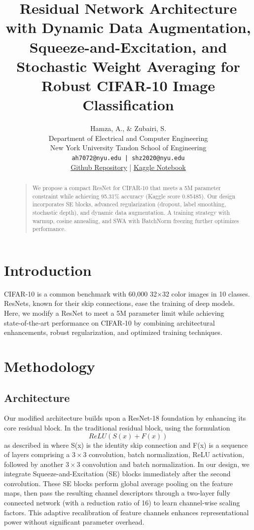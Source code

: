 \documentclass[letterpaper]{article}
\begin{document}
\title{Residual Network Architecture with Dynamic Data Augmentation, Squeeze-and-Excitation, and Stochastic Weight Averaging for Robust CIFAR-10 Image Classification}
\author{Hamza, A., \& Zubairi, S. \\
Department of Electrical and Computer Engineering\\
New York University Tandon School of Engineering\\
\texttt{ah7072@nyu.edu | shz2020@nyu.edu}\\
\href{https://github.com/hurryingauto3/ece-gy-7143-deeplearning/tree/main/project_1}{Github Repository} | \href{https://www.kaggle.com/code/hurryingauto3/notebookeb139646e3}{Kaggle Notebook}
}
\maketitle
\begin{abstract}
\begin{quote}
We propose a compact ResNet for CIFAR‑10 that meets a 5M parameter constraint while achieving 95.31\% accuracy (Kaggle score 0.85485). Our design incorporates SE blocks, advanced regularization (dropout, label smoothing, stochastic depth), and dynamic data augmentation. A training strategy with warmup, cosine annealing, and SWA with BatchNorm freezing further optimizes performance.
\end{quote}
\end{abstract}
\section{Introduction}
CIFAR‑10 is a common benchmark with 60,000 32×32 color images in 10 classes. ResNets, known for their skip connections, ease the training of deep models. Here, we modify a ResNet to meet a 5M parameter limit while achieving state‑of‑the‑art performance on CIFAR‑10 by combining architectural enhancements, robust regularization, and optimized training techniques.

\section{Methodology}
\subsection{Architecture}
Our modified architecture builds upon a ResNet-18 foundation by enhancing its core residual block. In the traditional residual block, using the formulation \[ReLU(S(x)+F(x))\] as described in \cite{he2015deep} where S(x) is the identity skip connection and F(x) is a sequence of layers comprising a $3\times 3$ convolution, batch normalization, ReLU activation, followed by another $3\times 3$ convolution and batch normalization. In our design, we integrate Squeeze-and-Excitation (SE) blocks \cite{hu2018squeeze} immediately after the second convolution. These SE blocks perform global average pooling on the feature maps, then pass the resulting channel descriptors through a two-layer fully connected network (with a reduction ratio of 16) to learn channel-wise scaling factors. This adaptive recalibration of feature channels enhances representational power without significant parameter overhead.
\end{document}

